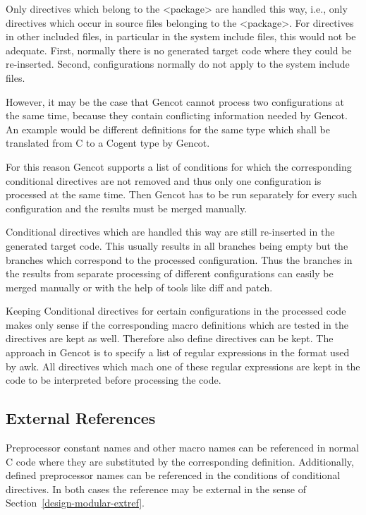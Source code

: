 Only directives which belong to the <package> are handled this way, i.e., only directives which occur in source
files belonging to the <package>. For directives in other included files, in particular in the system include files,
this would not be adequate. First, normally there is no generated target code where they could be re-inserted.
Second, configurations normally do not apply to the system include files.

However, it may be the case that Gencot cannot process two configurations at the same time, because they contain
conflicting information needed by Gencot. An example would be different definitions for the same type which
shall be translated from C to a Cogent type by Gencot.

For this reason Gencot supports a list of conditions for which the corresponding conditional directives are not 
removed and thus only one configuration is processed at the same time. Then Gencot has to be run separately for every
such configuration and the results must be merged manually.

Conditional directives which are handled this way are still re-inserted in the generated target code. This
usually results in all branches being empty but the branches which correspond to the processed configuration.
Thus the branches in the results from separate processing of different configurations can easily be merged manually
or with the help of tools like diff and patch.

Keeping Conditional directives for certain configurations in the processed code makes only sense if the corresponding
macro definitions which are tested in the directives are kept as well. Therefore also define directives can be
kept. The approach in Gencot is to specify a list of regular expressions in the format used by awk. All directives
which mach one of these regular expressions are kept in the code to be interpreted before processing the code.

\subsection{External References}

Preprocessor constant names and other macro names can be referenced in normal C code where they are substituted
by the corresponding definition. Additionally, defined preprocessor names can be referenced in the conditions
of conditional directives. In both cases the reference may be external in the sense of Section~\ref{design-modular-extref}.

